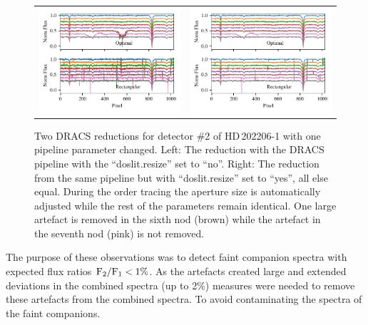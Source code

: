 \begin{figure}
    \centering
    \begin{tabular}{cc}
        \includegraphics[width=0.5\linewidth]{figures/reduction/bp_plots/non_resized_nods_HD202206-1_chip_2} & \includegraphics[width=0.5\linewidth]{figures/reduction/bp_plots/resized_nods_HD202206-1_chip_2}\\
    \end{tabular}\label{fig:resizednods}
    \caption{Two {DRACS} reductions for detector \#2 of HD\,202206-1 with one pipeline parameter changed.
        Left: The reduction with the {DRACS} pipeline with the ``doslit.resize'' set to ``no''.
        Right: The reduction from the same pipeline but with ``doslit.resize'' set to ``yes'', all else equal.
        During the order tracing the aperture size is automatically adjusted while the rest of the parameters remain identical.
        One large artefact is removed in the sixth nod (brown) while the artefact in the seventh nod (pink) is not removed.}
\end{figure}

The purpose of these observations was to detect faint companion spectra with expected flux ratios \(\rm {F_2}/{F_1} < 1\%\).
As the artefacts created large and extended deviations in the combined spectra (up to 2\%) measures were needed to remove these artefacts from the combined spectra.
To avoid contaminating the spectra of the faint companions.

